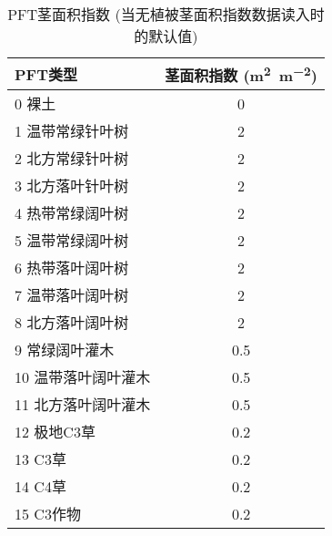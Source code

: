 \begin{table}[htbp]
  \centering
  \caption[PFT茎面积指数]{PFT茎面积指数 (当无植被茎面积指数数据读入时的默认值)}
  \label{tab:PFT茎面积指数}
  \begin{tabular}{@{}lc@{}}
    \toprule
    PFT类型             & 茎面积指数 (\unit{m^2.m^{-2}}) \\ \midrule
    0 裸土              & 0                              \\
    1 温带常绿针叶树    & 2                              \\
    2 北方常绿针叶树    & 2                              \\
    3 北方落叶针叶树    & 2                              \\
    4 热带常绿阔叶树    & 2                              \\
    5 温带常绿阔叶树    & 2                              \\
    6 热带落叶阔叶树    & 2                              \\
    7 温带落叶阔叶树    & 2                              \\
    8 北方落叶阔叶树    & 2                              \\
    9 常绿阔叶灌木      & 0.5                            \\
    10 温带落叶阔叶灌木 & 0.5                            \\
    11 北方落叶阔叶灌木 & 0.5                            \\
    12 极地C3草         & 0.2                            \\
    13 C3草             & 0.2                            \\
    14 C4草             & 0.2                            \\
    15 C3作物           & 0.2                            \\ \bottomrule
  \end{tabular}
\end{table}


